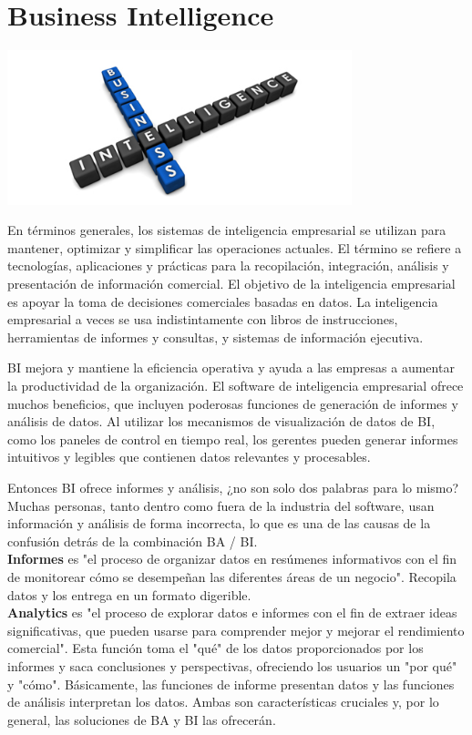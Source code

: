 \section{Business Intelligence} 
\vspace{16mm} %
\begin{center}
\includegraphics[width=10cm]{./Imagenes/001}
\end{center}	
\vspace{12mm} %

	En términos generales, los sistemas de inteligencia empresarial se utilizan para mantener, optimizar y simplificar las operaciones actuales. El término se refiere a tecnologías, aplicaciones y prácticas para la recopilación, integración, análisis y presentación de información comercial. El objetivo de la inteligencia empresarial es apoyar la toma de decisiones comerciales basadas en datos. La inteligencia empresarial a veces se usa indistintamente con libros de instrucciones, herramientas de informes y consultas, y sistemas de información ejecutiva.

BI mejora y mantiene la eficiencia operativa y ayuda a las empresas a aumentar la productividad de la organización. El software de inteligencia empresarial ofrece muchos beneficios, que incluyen poderosas funciones de generación de informes y análisis de datos. Al utilizar los mecanismos de visualización de datos de BI, como los paneles de control en tiempo real, los gerentes pueden generar informes intuitivos y legibles que contienen datos relevantes y procesables.

Entonces BI ofrece informes y análisis, ¿no son solo dos palabras para lo mismo? Muchas personas, tanto dentro como fuera de la industria del software, usan información y análisis de forma incorrecta, lo que es una de las causas de la confusión detrás de la combinación BA / BI.\\

\textbf{Informes} es "el proceso de organizar datos en resúmenes informativos con el fin de monitorear cómo se desempeñan las diferentes áreas de un negocio". Recopila datos y los entrega en un formato digerible.\\

\textbf{Analytics} es "el proceso de explorar datos e informes con el fin de extraer ideas significativas, que pueden usarse para comprender mejor y mejorar el rendimiento comercial". Esta función toma el "qué" de los datos proporcionados por los informes y saca conclusiones y perspectivas, ofreciendo los usuarios un "por qué" y "cómo". Básicamente, las funciones de informe presentan datos y las funciones de análisis interpretan los datos. Ambas son características cruciales y, por lo general, las soluciones de BA y BI las ofrecerán.
	


